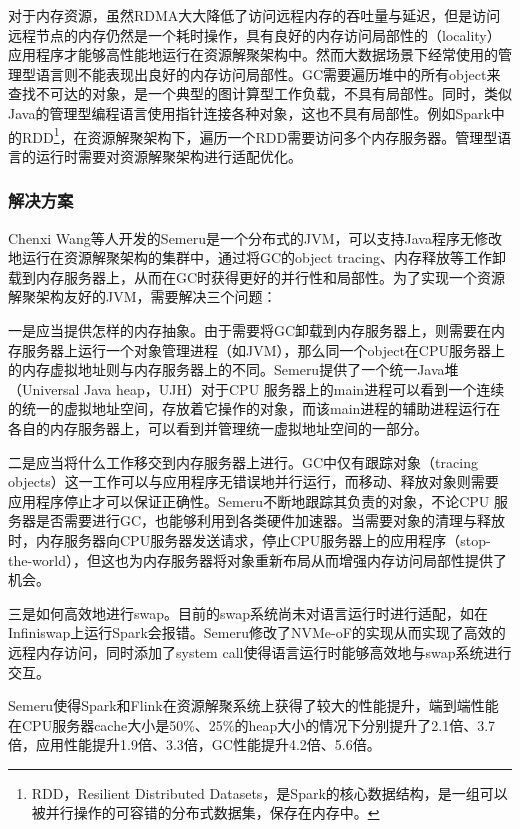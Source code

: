 \documentclass[lang=cn,12pt,a4paper,cite=authoryear]{elegantpaper}
\begin{document}
对于内存资源，虽然RDMA大大降低了访问远程内存的吞吐量与延迟，但是访问远程节点的内存仍然是一个耗时操作，具有良好的内存访问局部性的（locality）应用程序才能够高性能地运行在资源解聚架构中。然而大数据场景下经常使用的管理型语言则不能表现出良好的内存访问局部性。GC需要遍历堆中的所有object来查找不可达的对象，是一个典型的图计算型工作负载，不具有局部性。同时，类似Java的管理型编程语言使用指针连接各种对象，这也不具有局部性。例如Spark中的RDD\footnote{RDD，Resilient Distributed Datasets\cite{DBLP:conf/nsdi/ZahariaCDDMMFSS12}，是Spark的核心数据结构，是一组可以被并行操作的可容错的分布式数据集，保存在内存中。}，在资源解聚架构下，遍历一个RDD需要访问多个内存服务器。管理型语言的运行时需要对资源解聚架构进行适配优化。

\subsubsection{解决方案}
Chenxi Wang等人开发的Semeru\cite{semeru}是一个分布式的JVM，可以支持Java程序无修改地运行在资源解聚架构的集群中，通过将GC的object tracing、内存释放等工作卸载到内存服务器上，从而在GC时获得更好的并行性和局部性。为了实现一个资源解聚架构友好的JVM，需要解决三个问题：

一是应当提供怎样的内存抽象。由于需要将GC卸载到内存服务器上，则需要在内存服务器上运行一个对象管理进程（如JVM），那么同一个object在CPU服务器上的内存虚拟地址则与内存服务器上的不同。Semeru提供了一个统一Java堆（Universal Java heap，UJH）对于CPU 服务器上的main进程可以看到一个连续的统一的虚拟地址空间，存放着它操作的对象，而该main进程的辅助进程运行在各自的内存服务器上，可以看到并管理统一虚拟地址空间的一部分。

二是应当将什么工作移交到内存服务器上进行。GC中仅有跟踪对象（tracing objects）这一工作可以与应用程序无错误地并行运行，而移动、释放对象则需要应用程序停止才可以保证正确性。Semeru不断地跟踪其负责的对象，不论CPU 服务器是否需要进行GC，也能够利用到各类硬件加速器。当需要对象的清理与释放时，内存服务器向CPU服务器发送请求，停止CPU服务器上的应用程序（stop-the-world），但这也为内存服务器将对象重新布局从而增强内存访问局部性提供了机会。

三是如何高效地进行swap。目前的swap系统尚未对语言运行时进行适配，如在Infiniswap\cite{DBLP:conf/nsdi/GuLZCS17}上运行Spark会报错。Semeru修改了NVMe-oF的实现从而实现了高效的远程内存访问，同时添加了system call使得语言运行时能够高效地与swap系统进行交互。

Semeru使得Spark和Flink在资源解聚系统上获得了较大的性能提升，端到端性能在CPU服务器cache大小是50\%、25\%的heap大小的情况下分别提升了2.1倍、3.7倍，应用性能提升1.9倍、3.3倍，GC性能提升4.2倍、5.6倍。
\end{document}
